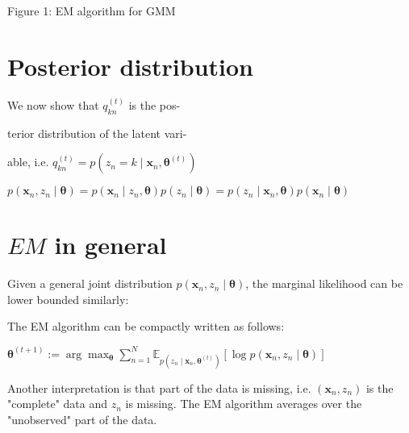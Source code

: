 Figure 1: EM algorithm for GMM

\section*{Posterior distribution}
We now show that $q_{k n}^{(t)}$ is the pos-

terior distribution of the latent vari-

able, i.e. $q_{k n}^{(t)}=p\left(z_{n}=k \mid \mathbf{x}_{n}, \boldsymbol{\theta}^{(t)}\right)$

$p\left(\mathbf{x}_{n}, z_{n} \mid \boldsymbol{\theta}\right)=p\left(\mathbf{x}_{n} \mid z_{n}, \boldsymbol{\theta}\right) p\left(z_{n} \mid \boldsymbol{\theta}\right)=p\left(z_{n} \mid \mathbf{x}_{n}, \boldsymbol{\theta}\right) p\left(\mathbf{x}_{n} \mid \boldsymbol{\theta}\right)$


\section*{$E M$ in general}
Given a general joint distribution $p\left(\mathbf{x}_{n}, z_{n} \mid \boldsymbol{\theta}\right)$, the marginal likelihood can be lower bounded similarly:

The EM algorithm can be compactly written as follows:

$\boldsymbol{\theta}^{(t+1)}:=\arg \max _{\boldsymbol{\theta}} \sum_{n=1}^{N} \mathbb{E}_{p\left(z_{n} \mid \mathbf{x}_{n}, \boldsymbol{\theta}^{(t)}\right)}\left[\log p\left(\mathbf{x}_{n}, z_{n} \mid \boldsymbol{\theta}\right)\right]$

Another interpretation is that part of the data is missing, i.e. $\left(\mathbf{x}_{n}, z_{n}\right)$ is the "complete" data and $z_{n}$ is missing. The EM algorithm averages over the "unobserved" part of the data.